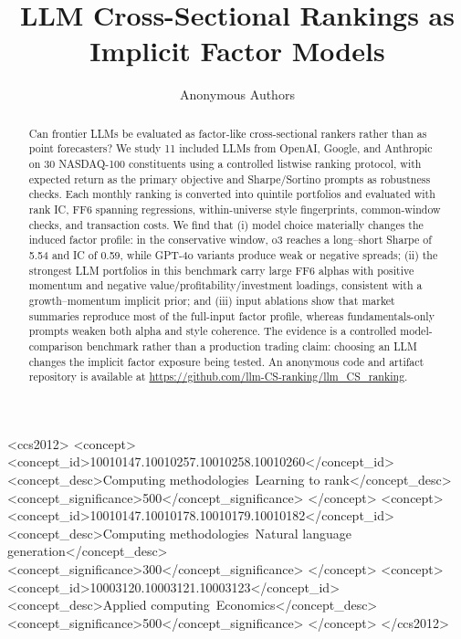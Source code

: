 \documentclass[sigconf, anonymous, authoryear, nonacm]{acmart}
\title{LLM Cross-Sectional Rankings as Implicit Factor Models}
\author{Anonymous Authors}
\affiliation{%
  \institution{Anonymous Institution}
  \country{}
}
\begin{document}
\begin{abstract}
Can frontier LLMs be evaluated as factor-like cross-sectional rankers rather than as point forecasters?
We study 11 included LLMs from OpenAI, Google, and Anthropic on 30 NASDAQ-100 constituents using a controlled listwise ranking protocol, with expected return as the primary objective and Sharpe/Sortino prompts as robustness checks.
Each monthly ranking is converted into quintile portfolios and evaluated with rank IC, FF6 spanning regressions, within-universe style fingerprints, common-window checks, and transaction costs.
We find that (i) model choice materially changes the induced factor profile: in the conservative window, o3 reaches a long--short Sharpe of 5.54 and IC of 0.59, while GPT-4o variants produce weak or negative spreads;
(ii) the strongest LLM portfolios in this benchmark carry large FF6 alphas with positive momentum and negative value/profitability/investment loadings, consistent with a growth--momentum implicit prior;
and (iii) input ablations show that market summaries reproduce most of the full-input factor profile, whereas fundamentals-only prompts weaken both alpha and style coherence.
The evidence is a controlled model-comparison benchmark rather than a production trading claim: choosing an LLM changes the implicit factor exposure being tested.
An anonymous code and artifact repository is available at \url{https://github.com/llm-CS-ranking/llm_CS_ranking}.
\end{abstract}

\begin{CCSXML}
<ccs2012>
   <concept>
       <concept_id>10010147.10010257.10010258.10010260</concept_id>
       <concept_desc>Computing methodologies~Learning to rank</concept_desc>
       <concept_significance>500</concept_significance>
   </concept>
   <concept>
       <concept_id>10010147.10010178.10010179.10010182</concept_id>
       <concept_desc>Computing methodologies~Natural language generation</concept_desc>
       <concept_significance>300</concept_significance>
   </concept>
   <concept>
       <concept_id>10003120.10003121.10003123</concept_id>
       <concept_desc>Applied computing~Economics</concept_desc>
       <concept_significance>500</concept_significance>
   </concept>
</ccs2012>
\end{CCSXML}

\end{document}
